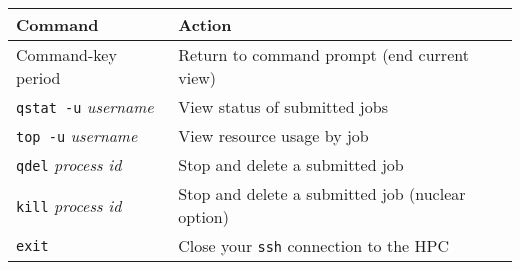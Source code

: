 \documentclass[12pt,letterpaper]{article}
\begin{document}
\begin{center}
		\begin{tabular}{ll}
			\hline
			\hline
			\textbf{Command} & \textbf{Action} \\
			\hline
			Command-key period & Return to command prompt (end current view)\\
			\texttt{qstat -u} \emph{username} &  View status of submitted jobs\\
			\texttt{top -u} \emph{username} & View resource usage by job \\
			\texttt{qdel} \emph{process id} & Stop and delete a submitted job \\
			\texttt{kill} \emph{process id} & Stop and delete a submitted job (nuclear option) \\
			\texttt{exit}  & Close your \texttt{ssh} connection to the HPC\\
			\hline
			\hline
		\end{tabular}
\end{center}
\end{document}
